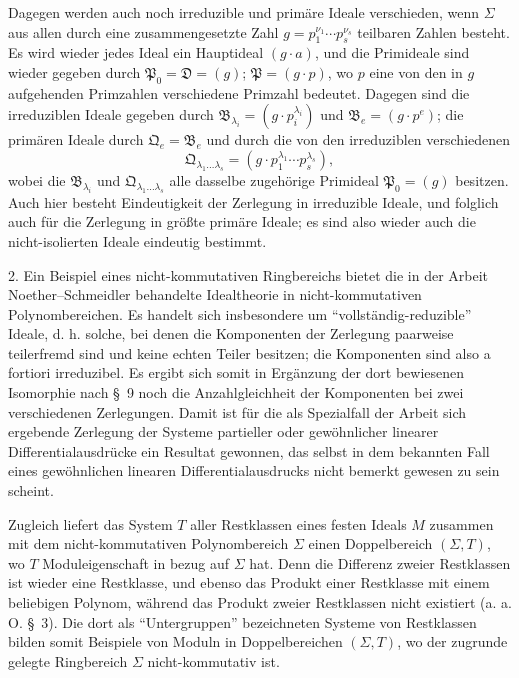 \documentclass[11pt]{article}
\newcommand{\ideal}[1]{\mathfrak{#1}}
\begin{document}
Dagegen werden auch noch irreduzible und primäre Ideale verschieden, wenn $\Sigma$ aus allen durch eine zusammengesetzte Zahl $g=p_1^{\nu_1}\cdots p_s^{\nu_s}$ teilbaren Zahlen besteht. Es wird wieder jedes Ideal ein Hauptideal $(g\cdot a)$, und die Primideale sind wieder gegeben durch $\ideal P_0=\ideal D=(g)$; $\ideal P=(g\cdot p)$, wo $p$ eine von den in $g$ aufgehenden Primzahlen verschiedene Primzahl bedeutet. Dagegen sind die irreduziblen Ideale gegeben durch $\ideal B_{\lambda_i}=(g\cdot p_i^{\lambda_i})$ und $\ideal B_e=(g\cdot p^e)$; die primären Ideale durch $\ideal Q_e=\ideal B_e$ und durch die von den irreduziblen verschiedenen
\[
 \ideal Q_{\lambda_1\ldots\lambda_s}=(g\cdot p_1^{\lambda_1}\cdots p_s^{\lambda_s}),
\]
wobei die $\ideal B_{\lambda_i}$ und $\ideal Q_{\lambda_1\ldots\lambda_s}$ alle dasselbe zugehörige Primideal $\ideal P_0=(g)$ besitzen. Auch hier besteht Eindeutigkeit der Zerlegung in irreduzible Ideale, und folglich auch für die Zerlegung in größte primäre Ideale; es sind also wieder auch die nicht-isolierten Ideale eindeutig bestimmt.

2. Ein Beispiel eines nicht-kommutativen Ringbereichs bietet die in der Arbeit Noether--Schmeidler behandelte Idealtheorie in nicht-kommutativen Polynombereichen. Es handelt sich insbesondere um ``vollständig-reduzible'' Ideale, d. h. solche, bei denen die Komponenten der Zerlegung paarweise teilerfremd sind und keine echten Teiler besitzen; die Komponenten sind also a fortiori irreduzibel. Es ergibt sich somit in Ergänzung der dort bewiesenen Isomorphie nach \S~9 noch die Anzahlgleichheit der Komponenten bei zwei verschiedenen Zerlegungen. Damit ist für die als Spezialfall der Arbeit sich ergebende Zerlegung der Systeme partieller oder gewöhnlicher linearer Differentialausdrücke ein Resultat gewonnen, das selbst in dem bekannten Fall eines gewöhnlichen linearen Differentialausdrucks nicht bemerkt gewesen zu sein scheint.

Zugleich liefert das System $T$ aller Restklassen eines festen Ideals $M$ zusammen mit dem nicht-kommutativen Polynombereich $\Sigma$ einen Doppelbereich $(\Sigma,T)$, wo $T$ Moduleigenschaft in bezug auf $\Sigma$ hat. Denn die Differenz zweier Restklassen ist wieder eine Restklasse, und ebenso das Produkt einer Restklasse mit einem beliebigen Polynom, während das Produkt zweier Restklassen nicht existiert (a. a. O. \S~3). Die dort als ``Untergruppen'' bezeichneten Systeme von Restklassen bilden somit Beispiele von Moduln in Doppelbereichen $(\Sigma,T)$, wo der zugrunde gelegte Ringbereich $\Sigma$ nicht-kommutativ ist.
\end{document}
